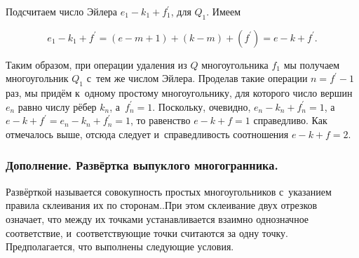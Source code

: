Подсчитаем число Эйлера $e_{1} - k_{1} + f^{\prime}_{1}$, для $Q_{1}$.
Имеем

\begin{equation*}
  e_{1} - k_{1} + f^{\prime} =
(e - m + 1) + (k - m) + (f^{\prime}) =
e - k + f^{\prime}.
\end{equation*}

Таким образом, при операции удаления из $Q$ многоугольника $f_{1}$
мы получаем многоугольник $Q_{1}$ с~тем же числом Эйлера. Проделав такие
операции $n = f^{\prime} - 1$ раз, мы придём к~одному простому многоугольнику,
для которого число вершин $e_{n}$ равно числу рёбер
$k_{n}$, а~$f^{\prime}_n = 1$.
Поскольку, очевидно, $e_{n} - k_{n} + f^{\prime}_{n} = 1$,
а~$e - k + f^{\prime} = e_{n} - k_{n} + f^{\prime}_{n} = 1$, то равенство
$e - k + f = 1$ справедливо.
Как отмечалось выше, отсюда следует и~справедливость соотношения $e - k + f = 2$.


\subsubsection{Дополнение. Развёртка выпуклого многогранника.}

Развёрткой называется совокупность простых многоугольников с~указанием правила
склеивания их по сторонам..При этом склеивание двух отрезков означает,
что между их точками устанавливается взаимно однозначное соответствие,
и~соответствующие точки считаются за одну точку.
Предполагается, что выполнены следующие условия.

